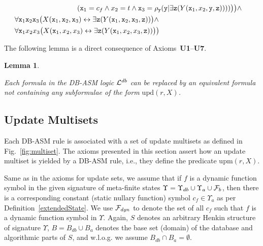 \documentclass[preprint,11pt]{elsarticle}
\newtheorem{lemma}[theorem]{Lemma}
\theoremstyle{definition}
\theoremstyle{remark}
\begin{document}
\begin{itemize}
\begin{align*}
&\hspace*{3.1cm}(\mathtt{x}_1 = c_f \wedge x_2 = t \wedge \mathtt{x}_3=\rho_{\mathtt{y}}(\mathtt{y}|\exists \mathtt{z} (Y(\mathtt{x}_1,x_2,\mathtt{y},\mathtt{z}))))\big)\big) \wedge&\\
&\forall \mathtt{x}_1 \mathtt{x}_2 \mathtt{x}_3 \big(X(\mathtt{x}_1,\mathtt{x}_2,\mathtt{x}_3) \leftrightarrow \exists \mathtt{z} (Y(\mathtt{x}_1,\mathtt{x}_2,\mathtt{x}_3,\mathtt{z}))\big) \wedge &\\
&\forall \mathtt{x}_1 x_2 x_3 \big(X(\mathtt{x}_1,x_2,x_3) \leftrightarrow \exists \mathtt{z} (Y(\mathtt{x}_1,x_2,x_3,\mathtt{z}))\big)\big) &
\end{align*}
\end{itemize}

The following lemma is a direct consequence of Axioms~\textbf{U1}--\textbf{U7}. 

\begin{lemma}\label{lem-upd}

Each formula in the DB-ASM logic ${\cal L}^{db}$ can be replaced by an equivalent formula not containing any subformulae of the form $\mathrm{upd}(r,X)$.

\end{lemma}

\subsection{Update Multisets}\label{sub:UpdateMultisets}

Each DB-ASM rule is associated with a set of update multisets as defined in Fig.~\ref{fig:multiset}. The axioms presented in this section assert how an update multiset is yielded by a DB-ASM rule, i.e., they define the predicate $\mathrm{upm}(r,X)$.  

Same as in the axioms for update sets, we assume that if $f$ is a dynamic function symbol in the given signature of meta-finite states $\Upsilon = \Upsilon_{db} \cup \Upsilon_a \cup {\cal F}_b$, then there is a corresponding constant (static nullary function) symbol $c_f \in \Upsilon_a$ as per Definition~\ref{extendedState}. We use ${\cal F}_{\mathit{dyn}}$ to denote the set of all $c_f$ such that $f$ is a dynamic function symbol in $\Upsilon$. Again, $S$ denotes an arbitrary Henkin structure of signature $\Upsilon$, $B=B_{db}\cup B_a$ denotes the base set (domain) of the database and algorithmic parts of $S$, and w.l.o.g. we assume $B_{db} \cap B_a = \emptyset$. 
\end{document}

